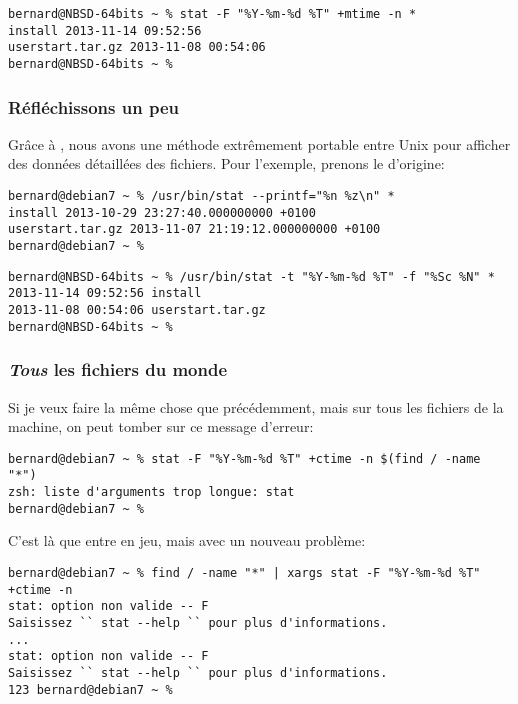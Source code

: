 \begin{lstlisting}[caption=stat depuis zsh sous NetBSD]
bernard@NBSD-64bits ~ % stat -F "%Y-%m-%d %T" +mtime -n *
install 2013-11-14 09:52:56
userstart.tar.gz 2013-11-08 00:54:06
bernard@NBSD-64bits ~ %
\end{lstlisting}

\subsubsection{Réfléchissons un peu}
Grâce à \zsh{}, nous avons une méthode extrêmement portable entre Unix pour afficher des données détaillées des fichiers. Pour l'exemple, prenons le  d'origine:

\begin{lstlisting}[caption=binaire stat depuis Debian]
bernard@debian7 ~ % /usr/bin/stat --printf="%n %z\n" *
install 2013-10-29 23:27:40.000000000 +0100
userstart.tar.gz 2013-11-07 21:19:12.000000000 +0100
bernard@debian7 ~ %
\end{lstlisting}

\begin{lstlisting}[caption=binaire stat depuis NetBSD]
bernard@NBSD-64bits ~ % /usr/bin/stat -t "%Y-%m-%d %T" -f "%Sc %N" *
2013-11-14 09:52:56 install
2013-11-08 00:54:06 userstart.tar.gz
bernard@NBSD-64bits ~ %
\end{lstlisting}

\subsubsection{\emph{Tous} les fichiers du monde}
Si je veux faire la même chose que précédemment, mais sur tous les fichiers de la machine, on peut tomber sur ce message d'erreur:

\begin{lstlisting}
bernard@debian7 ~ % stat -F "%Y-%m-%d %T" +ctime -n $(find / -name "*")
zsh: liste d'arguments trop longue: stat
bernard@debian7 ~ %
\end{lstlisting}

C'est là que  entre en jeu, mais avec un nouveau problème:

\begin{lstlisting}[caption=stat rien ne va plus]
bernard@debian7 ~ % find / -name "*" | xargs stat -F "%Y-%m-%d %T" +ctime -n
stat: option non valide -- F
Saisissez `` stat --help `` pour plus d'informations.
...
stat: option non valide -- F
Saisissez `` stat --help `` pour plus d'informations.
123 bernard@debian7 ~ %
\end{lstlisting}

